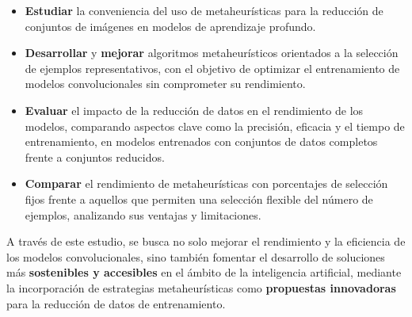 \begin{itemize}
    \item \textbf{Estudiar} la conveniencia del uso de metaheurísticas para la reducción de conjuntos de imágenes
          en modelos de aprendizaje profundo.
    \item \textbf{Desarrollar} y \textbf{mejorar} algoritmos metaheurísticos orientados a la selección de ejemplos representativos,
          con el objetivo de optimizar el entrenamiento de modelos convolucionales sin comprometer su rendimiento.
    \item \textbf{Evaluar} el impacto de la reducción de datos en el rendimiento de los modelos, comparando aspectos clave
          como la precisión, eficacia y el tiempo de entrenamiento, en modelos entrenados con conjuntos de datos completos frente a conjuntos reducidos.
    \item \textbf{Comparar} el rendimiento de metaheurísticas con porcentajes de selección fijos frente a aquellos que
          permiten una selección flexible del número de ejemplos, analizando sus ventajas y limitaciones.
\end{itemize}

A través de este estudio, se busca no solo mejorar el rendimiento y la eficiencia de los modelos convolucionales,
sino también fomentar el desarrollo de soluciones más \textbf{sostenibles y accesibles} en el ámbito de la inteligencia artificial,
mediante la incorporación de estrategias metaheurísticas como \textbf{propuestas innovadoras} para la reducción de datos de entrenamiento.

